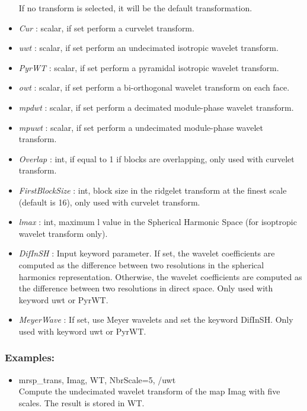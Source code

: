 \begin{itemize}
If no transform is selected, it will be the default transformation.
\item {\em Cur} : scalar, if set perform a curvelet transform.
\item {\em uwt} : scalar, if set perform an undecimated isotropic wavelet transform.
\item {\em PyrWT} : scalar, if set perform a pyramidal isotropic wavelet transform.
\item {\em owt} : scalar, if set perform a bi-orthogonal wavelet transform on each face.
\item {\em mpdwt} : scalar, if set perform a decimated module-phase wavelet transform.
\item {\em mpuwt} : scalar, if set perform a undecimated module-phase wavelet transform.
\item {\em Overlap} : int, if equal to 1 if blocks are overlapping, only used with curvelet transform.
\item {\em FirstBlockSize} : int, block size in the ridgelet transform at the finest scale (default is 16), only used with curvelet transform.
\item {\em lmax} : int, maximum l value in the Spherical Harmonic Space (for isoptropic wavelet transform only).
\item {\em DifInSH} : Input keyword parameter. If set, the wavelet coefficients are computed as the difference between two resolutions in the spherical harmonics representation. 
Otherwise, the wavelet coefficients are computed as the difference between two resolutions in direct space. Only used with keyword uwt or PyrWT.
\item {\em MeyerWave} : If set, use Meyer wavelets and set the keyword DifInSH. Only used with keyword uwt or PyrWT.
\end{itemize}

\subsubsection*{Examples:} 
\begin{itemize}
\item mrsp\_trans, Imag, WT, NbrScale=5, /uwt \\
Compute the undecimated wavelet transform of the map Imag with five scales. The result is stored in WT.
\end{itemize}



